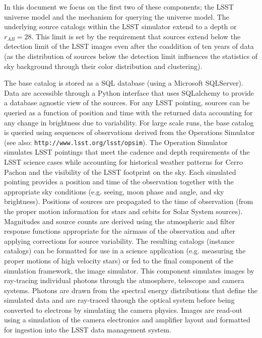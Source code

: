 \documentclass[]{article}
\begin{document}
In this document we focus on the first two of these components; the LSST
universe model and the mechanism for querying the universe model.  
The underlying source catalogs within the LSST
simulator extend to a depth or $r_{AB}=28$. This limit is set by the
requirement that sources extend below the detection limit of the LSST
images even after the coaddition of ten years of data (as the
distribution of sources below the detection limit influences the
statistics of sky background through their color distribution and
clustering).

The base catalog is stored as a SQL database (using a Microsoft
SQLServer). Data are accessible through a Python interface that uses
SQLalchemy to provide a database agnostic view of the sources. For any
LSST pointing, sources can be queried as a function of position and
time with the returned data accounting for any change in brightness
due to variability. For large scale runs, the base catalog is queried
using sequences of observations derived from the Operations Simulator
\cite{cook09} (see also: {\tt http://www.lsst.org/lsst/opsim}). 
The Operation Simulator simulates LSST pointings that
meet the cadence and depth requirements of the LSST science cases
while accounting for historical weather patterns for Cerro Pachon and
the visibility of the LSST footprint on the sky. Each simulated
pointing provides a position and time of the observation together with
the appropriate sky conditions (e.g. seeing, moon phase and angle, and
sky brightness). Positions of sources are propagated to the time of
observation (from the proper motion information for stars and orbits
for Solar System sources). Magnitudes and source counts are derived
using the atmospheric and filter response functions appropriate for
the airmass of the observation and after applying corrections for
source variability. The resulting catalogs (instance catalogs) can be
formatted for use in a science application (e.g. measuring the proper
motions of high velocity stars) or fed to the final component of the
simulation framework, the image simulator. This component simulates
images by ray-tracing individual photons through the atmosphere,
telescope and camera systems. Photons are drawn from the spectral
energy distributions that define the simulated data and are ray-traced
through the optical system before being converted to electrons by
simulating the camera physics. Images are read-out using a simulation
of the camera electronics and amplifier layout and formatted for
ingestion into the LSST data management system.
\end{document}
